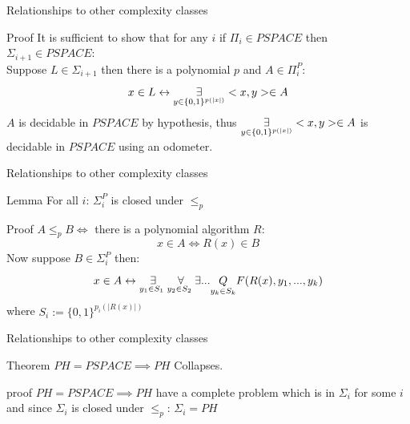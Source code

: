         \begin{frame}{Relationships to other  complexity classes}
            \begin{block}{Proof}
                It is sufficient to show that for any $i$ if $\Pi_i \in PSPACE$ then $\Sigma_{i+1} \in PSPACE$:\\
                Suppose $L \in \Sigma_{i+1}$ then there is a polynomial $p$ and $A \in \Pi_i^P$:
                $$x \in L \leftrightarrow \overset{{}}{\underset{{y\in \{0,1\}^{p(|x|)}}}{\Large \exists}} <x,y> \in A$$
                $A$ is decidable in $PSPACE$ by hypothesis, thus $\overset{{}}{\underset{{y\in \{0,1\}^{p(|x|)}}}{\Large \exists}} <x,y> \in A$ is decidable in $PSPACE$ using an odometer.
            \end{block}
        \end{frame}

        \begin{frame}{Relationships to other  complexity classes}
            \begin{block}{Lemma}
                For all $i$: $\Sigma_i^P$  is closed under $\leq_p$
            \end{block}
            \pause
            \begin{block}{Proof}
                $A \leq_p B \iff$ there is a polynomial algorithm $R$:
                    $$x\in A \iff R(x) \in B$$
                Now suppose $B \in \Sigma_i^P$ then:
                $$x \in A \leftrightarrow 
                    \overset{{}}{\underset{{y_1 \in S_1\text{ }}}{\Large \exists}}
                    \overset{{}}{\underset{{y_2 \in S_2\text{ }}}{\Large \forall}}
                    \exists ...\underset{y_k \in S_k}{Q} F(R(x),y_1,...,y_k)$$
                where $S_i := \{0,1\}^{p_i(|R(x)|)}$
            \end{block}
        \end{frame}
        \begin{frame}{Relationships to other  complexity classes}
            \begin{block}{Theorem}
                $PH = PSPACE \implies PH$ Collapses.
            \end{block}
            \pause
            \begin{block}{proof}
                $PH = PSPACE \implies PH$ have a complete problem which is in $\Sigma_i$ for some $i$ and since $\Sigma_i$ is closed under $\leq_p$: $\Sigma_i = PH$
            \end{block}
        \end{frame}
        
